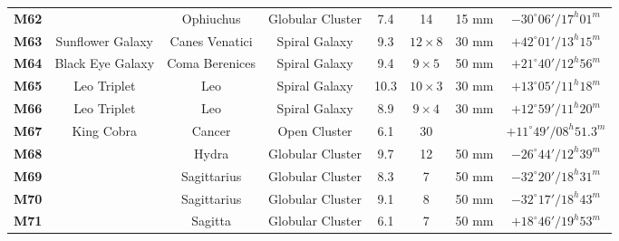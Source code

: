 \documentclass[a4paper,12pt]{extarticle}
\begin{document}
\begin{table}[H]
\begin{tabular}{cccccccc}
\rowcolor[HTML]{FFF2CC} 
\textbf{M62} &                                                              & Ophiuchus      & Globular Cluster & 7.4 & 14  & 15 mm                                        & $-30^\circ 06'/ 17^h 01^m$   \\
\rowcolor[HTML]{00FFFF} 
\textbf{M63} & \multicolumn{1}{c}{\cellcolor[HTML]{00FFFF}Sunflower Galaxy} & Canes Venatici & Spiral Galaxy    & 9.3 & $12\times 8$ & 30 mm                                        & $+42^\circ 01'/ 13^h 15^m$   \\
\rowcolor[HTML]{00FFFF} 
\textbf{M64} & \multicolumn{1}{c}{\cellcolor[HTML]{00FFFF}Black Eye Galaxy} & Coma Berenices & Spiral Galaxy    & 9.4 & $9\times5$  & 50 mm                                        & $+21^\circ 40'/ 12^h 56^m$   \\
\rowcolor[HTML]{00FFFF} 
\textbf{M65} &      Leo Triplet                                                        & Leo            & Spiral Galaxy    & 10.3 & $10\times3$ & 30 mm                                        & $+13^\circ 05'/ 11^h 18^m$   \\
\rowcolor[HTML]{00FFFF} 
\textbf{M66} &        Leo Triplet                                                      & Leo            & Spiral Galaxy    & 8.9 & $9\times4$  & 30 mm                                        & $+12^\circ 59'/ 11^h 20^m$   \\
\rowcolor[HTML]{D9EAD3} 
\textbf{M67} & \multicolumn{1}{c}{\cellcolor[HTML]{D9EAD3}King Cobra}       & Cancer         & Open Cluster     & 6.1 & 30  & \multicolumn{1}{l}{\cellcolor[HTML]{D9EAD3}} & $+11^\circ 49'/ 08^h 51.3^m$ \\
\rowcolor[HTML]{FFF2CC} 
\textbf{M68} &                                                              & Hydra          & Globular Cluster & 9.7 & 12  & 50 mm                                        & $-26^\circ 44'/ 12^h 39^m$   \\
\rowcolor[HTML]{FFF2CC} 
\textbf{M69} &                                                              & Sagittarius    & Globular Cluster & 8.3 & 7   & 50 mm                                        & $-32^\circ 20'/ 18^h 31^m$   \\
\rowcolor[HTML]{FFF2CC} 
\textbf{M70} &                                                              & Sagittarius    & Globular Cluster & 9.1 & 8   & 50 mm                                        & $-32^\circ 17'/ 18^h 43^m$   \\
\rowcolor[HTML]{FFF2CC} 
\textbf{M71} &                                                              & Sagitta        & Globular Cluster & 6.1 & 7   & 50 mm                                        & $+18^\circ 46'/ 19^h 53^m$  \\

\end{tabular}
\end{table}
\end{document}
